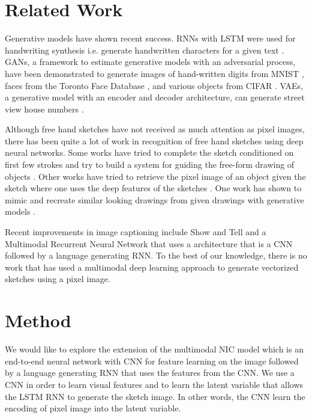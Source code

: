 \documentclass{article}
\begin{document}
\section{Related Work}
Generative models have shown recent success. RNNs with LSTM were used for handwriting synthesis i.e. generate handwritten characters for a given text \cite{DBLP:journals/corr/Graves13}. GANs, a framework to estimate generative models with an adversarial process, have been demonstrated to generate images of hand-written digits from MNIST \cite{MNIST}, faces from the Toronto Face Database \cite{TFD}, and various objects from CIFAR \cite{CIFAR}. VAEs, a generative model with an encoder and decoder architecture, can generate street view house numbers \cite{DBLP:journals/corr/GregorDGW15}.

Although free hand sketches have not received as much attention as pixel images, there has been quite a lot of work in recognition of free hand sketches using deep neural networks. Some works have tried to complete the sketch conditioned on first few strokes and try to build a system for guiding the free-form drawing of objects \cite{qdpaper} \cite{rcp2}. Other works have tried to retrieve the pixel image of an object given the sketch \cite{sketchydb} where one uses the deep features of the sketches \cite{rcp1}. One work has shown to mimic and recreate similar looking drawings from given drawings with generative models \cite{qdpaper}.

Recent improvements in image captioning include Show and Tell \cite{DBLP:journals/corr/VinyalsTBE14} and a Multimodal Recurrent Neural Network \cite{DBLP:journals/corr/KarpathyF14} that uses a architecture that is a CNN followed by a language generating RNN. To the best of our knowledge, there is no work that has used a multimodal deep learning approach to generate vectorized sketches using a pixel image.


\section{Method}
We would like to explore the extension of the multimodal NIC model \cite{DBLP:journals/corr/VinyalsTBE14} which is an end-to-end neural network with CNN for feature learning on the image followed by a language generating RNN that uses the features from the CNN. We use a CNN in order to learn visual features and to learn the latent variable that allows the LSTM RNN to generate the sketch image. In other words, the CNN learn the encoding of pixel image into the latent variable.
\end{document}
